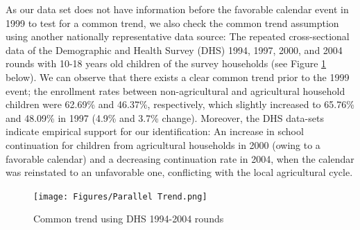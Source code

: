 \documentclass[12pt,letterpaper]{article}
\newcommand{\0}{\ensuremath{\mbox{\boldmath $0$}}}
\begin{document}
As our data set does not have information before the favorable calendar event in 1999 to test for a common trend, we also check the common trend assumption using another nationally representative data source: The repeated cross-sectional data of the Demographic and Health Survey (DHS) 1994, 1997, 2000, and 2004 rounds with 10-18 years old children of the survey households (see Figure \ref{ptrendDHS} below). We can observe that there exists a clear common trend prior to the 1999 event; the enrollment rates between non-agricultural and agricultural household children were 62.69\% and 46.37\%, respectively, which slightly increased to 65.76\% and 48.09\% in 1997 (4.9\% and 3.7\% change). Moreover, the DHS data-sets indicate empirical support for our identification: An increase in school continuation for children from agricultural households in 2000 (owing to a favorable calendar) and a decreasing continuation rate in 2004, when the calendar was reinstated to an unfavorable one, conflicting with the local agricultural cycle. 


\begin{figure}[h!]
\centering
\texttt{[image: Figures/Parallel Trend.png]}\\
\caption{Common trend using DHS 1994-2004 rounds}
\label{ptrendDHS}
\end{figure}
\end{document}
